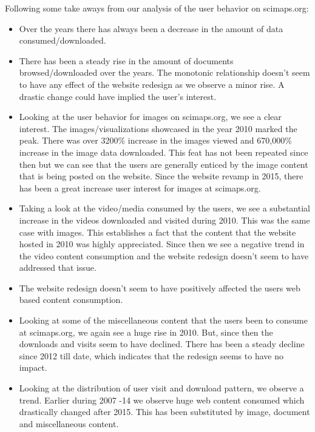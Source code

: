 Following some take aways from our analysis of the user behavior on scimaps.org: 
\begin{itemize}
\item Over the years there has always been a decrease in the amount of data consumed/downloaded. 
\item There has been a steady rise in the amount of documents browsed/downloaded over the years. The monotonic relationship doesn’t seem to have any effect of the website redesign as we observe a minor rise. A drastic change could have implied the user’s interest. 
\item Looking at the user behavior for images on scimaps.org, we see a clear interest. The images/visualizations showcased in the year 2010 marked the peak. There was over 3200$\%$ increase in the images viewed and 670,000$\%$ increase in the image data downloaded. This feat has not been repeated since then but we can see that the users are generally enticed by the image content that is being posted on the website. Since the website revamp in 2015, there has been a great increase user interest for images at scimaps.org.
\item  Taking a look at the video/media consumed by the users, we see a substantial increase in the videos downloaded and visited during 2010. This was the same case with images. This establishes a fact that the content that the website hosted in 2010 was highly appreciated. Since then we see a negative trend in the video content consumption and the website redesign doesn’t seem to have addressed that issue.
\item The website redesign doesn’t seem to have positively affected the users web based content consumption. 
\item Looking at some of the miscellaneous content that the users been to consume at scimaps.org, we again see a huge rise in 2010. But, since then the downloads and visits seem to have declined. There has been a steady decline since 2012 till date, which indicates that the redesign seems to have no impact.
\item Looking at the distribution of user visit and download pattern, we observe a trend. Earlier during 2007 -14 we observe huge web content consumed which drastically changed after 2015. This has been substituted by image, document and miscellaneous content.
\end{itemize}
